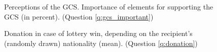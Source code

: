 \documentclass[12pt,english]{article}
\begin{document}
\begin{figure}[h!]
    \caption[Perceptions of the GCS]{Perceptions of the GCS. Importance of elements for supporting the GCS (in percent). (Question \ref{q:gcs_important})}\label{fig:gcs_important}
\end{figure}

\begin{figure}[h!]
    \caption[Donation to Africa vs. own country]{Donation in case of lottery win, depending on the recipient's (randomly drawn) nationality (mean). (Question \ref{q:donation})}\label{fig:donation}
\end{figure}
\end{document}
